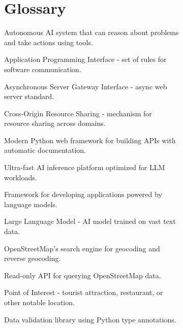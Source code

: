 \documentclass[12pt,a4paper]{report}
\begin{document}
\begin{figure}[H]
\begin{plantuml}
\begin{figure}[H]
\begin{plantuml}

\chapter*{Glossary}

\begin{description}[leftmargin=3cm, style=nextline]
    \item[Agent] Autonomous AI system that can reason about problems and take actions using tools.
    
    \item[API] Application Programming Interface - set of rules for software communication.
    
    \item[ASGI] Asynchronous Server Gateway Interface - async web server standard.
    
    \item[CORS] Cross-Origin Resource Sharing - mechanism for resource sharing across domains.
    
    \item[FastAPI] Modern Python web framework for building APIs with automatic documentation.
    
    \item[Groq] Ultra-fast AI inference platform optimized for LLM workloads.
    
    \item[LangChain] Framework for developing applications powered by language models.
    
    \item[LLM] Large Language Model - AI model trained on vast text data.
    
    \item[Nominatim] OpenStreetMap's search engine for geocoding and reverse geocoding.
    
    \item[Overpass] Read-only API for querying OpenStreetMap data.
    
    \item[POI] Point of Interest - tourist attraction, restaurant, or other notable location.
    
    \item[Pydantic] Data validation library using Python type annotations.
    

\end{description}
\end{plantuml}
\end{figure}
\end{plantuml}
\end{figure}
\end{document}
